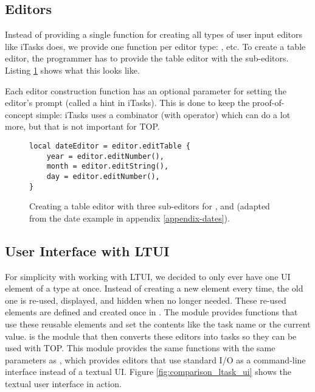 \subsection{Editors}
Instead of providing a single function for creating all types of user input editors like iTasks does, we provide one function per editor type: ,  etc. To create a table editor, the programmer has to provide the table editor with the sub-editors. Listing \ref{lst:ltasks_editors_table} shows what this looks like.

Each editor construction function has an optional parameter for setting the editor's prompt (called a hint in iTasks). This is done to keep the proof-of-concept simple: iTasks uses a  combinator (with  operator) which can do a lot more, but that is not important for TOP.

\begin{figure}[ht]
\centering
\begin{verbatim}
local dateEditor = editor.editTable {
    year = editor.editNumber(),
    month = editor.editString(),
    day = editor.editNumber(),
}
\end{verbatim}
\caption{Creating a table editor with three sub-editors for ,  and  (adapted from the date example in appendix \ref{appendix-dates}).}
\label{lst:ltasks_editors_table}
\end{figure}

\subsection{User Interface with LTUI}\label{section-ltasks-ltui}
For simplicity with working with LTUI, we decided to only ever have one UI element of a type at once. Instead of creating a new element every time, the old one is re-used, displayed, and hidden when no longer needed. These re-used elements are defined and created once in .
The module  provides functions that use these reusable elements and set the contents like the task name or the current value.
 is the module that then converts these editors into tasks so they can be used with TOP. This module provides the same functions with the same parameters as , which provides editors that use standard I/O as a command-line interface instead of a textual UI. Figure \ref{fig:comparison_ltask_ui} shows the textual user interface in action.

